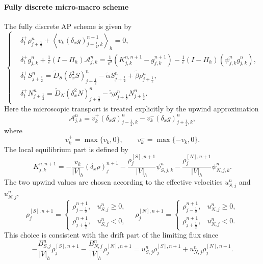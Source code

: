 \documentclass[11pt,twoside]{article}
\numberwithin{equation}{section}
\theoremstyle{plain}
\theoremstyle{nonumberplain}
\begin{document}
{\paragraph{Fully discrete micro-macro scheme}
The fully discrete AP scheme is given by
\begin{equation}\label{eq:modified-main-scheme}
\left\{
\begin{aligned}
&
\delta_t^+\rho_{j+\frac12}^n
+
\left\langle
v_k(\delta_x g)_{j+\frac12,k}^{n+1}
\right\rangle_h
=0,
\\[1mm]
&
\delta_t^+ g_{j,k}^n
+
\frac1\varepsilon
(I-\Pi_h)\mathcal A_{j,k}^n
=
\frac1{\varepsilon^2}
\left(
K_{j,k}^{n,n+1}
-
g_{j,k}^{n+1}
\right)
-
\frac1\varepsilon
(I-\Pi_h)(\psi_{j,k}^n g_{j,k}^n),
\\[1mm]
&
\delta_t^+S_{j+\frac12}^{n}
=
\widetilde D_S(\delta_x^2S)_{j+\frac12}^{n}
-\widetilde\alpha S_{j+\frac12}^{n}
+\widetilde\beta\rho_{j+\frac12}^{n},
\\[1mm]
&
\delta_t^+N_{j+\frac12}^{n}
=
\widetilde D_N(\delta_x^2N)_{j+\frac12}^{n}
-\widetilde\gamma\rho_{j+\frac12}^{n}N_{j+\frac12}^{n}.
\end{aligned}
\right.
\end{equation}
Here the microscopic transport is treated explicitly by the upwind
approximation
\[
\mathcal A_{j,k}^n
=
v_k^+(\delta_x g)_{j-\frac12,k}^{n}
-
v_k^-(\delta_x g)_{j+\frac12,k}^{n},
\]
where
\[
v_k^+=\max\{v_k,0\},
\qquad
v_k^-=\max\{-v_k,0\}.
\]
The local equilibrium part is defined by
\begin{equation}\label{eq:modified-K-two-upwind}
K_{j,k}^{n,n+1}
=
-\frac{v_k}{|V|_h}(\delta_x\rho)_j^{n+1}
-
\frac{\rho_j^{[S],n+1}}{|V|_h}\psi_{S,j,k}^n
-
\frac{\rho_j^{[N],n+1}}{|V|_h}\psi_{N,j,k}^n .
\end{equation}
The two upwind values are chosen according to the effective velocities
\(u_{S,j}^n\) and \(u_{N,j}^n\),
\[
\rho_j^{[S],n+1}
=
\begin{cases}
\rho_{j-\frac12}^{n+1}, & u_{S,j}^n\ge 0,\\
\rho_{j+\frac12}^{n+1}, & u_{S,j}^n<0,
\end{cases}
\quad 
\rho_j^{[N],n+1}
=
\begin{cases}
\rho_{j-\frac12}^{n+1}, & u_{N,j}^n\ge 0,\\
\rho_{j+\frac12}^{n+1}, & u_{N,j}^n<0.
\end{cases}
\]
This choice is consistent with the drift part of the limiting flux since
\[
-\frac{B_{S,j}^n}{|V|_h}\rho_j^{[S],n+1}
-
\frac{B_{N,j}^n}{|V|_h}\rho_j^{[N],n+1}
=
u_{S,j}^n\rho_j^{[S],n+1}
+
u_{N,j}^n\rho_j^{[N],n+1}.
\]

}
\end{document}
